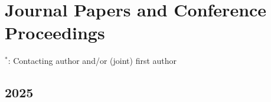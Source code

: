\documentclass[11pt,a4paper,sans]{moderncv}        %
\begin{document}





\section{Journal Papers and Conference Proceedings }
$^{\ast}$: Contacting author and/or (joint) first author\\

\subsection{2025}
\vspace{6pt}
\end{document}
